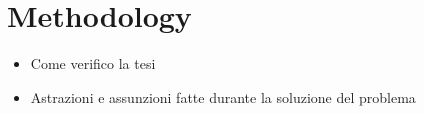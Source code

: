 \chapter{Methodology}

\begin{itemize}
	\item Come verifico la tesi
	\item Astrazioni e assunzioni fatte durante la soluzione del problema
\end{itemize}
